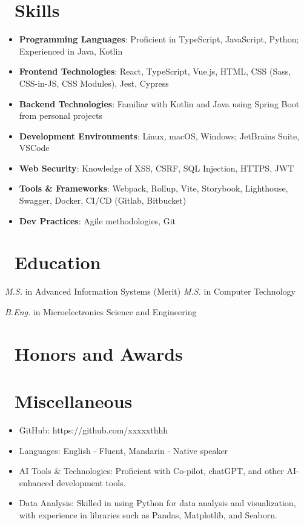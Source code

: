 \documentclass{resume}
\begin{document}
\section{\faCogs\ Skills}
\begin{itemize}[parsep=0.5ex]
  \item \textbf{Programming Languages}: Proficient in TypeScript, JavaScript, Python; Experienced in Java, Kotlin
  \item \textbf{Frontend Technologies}: React, TypeScript, Vue.js, HTML, CSS (Sass, CSS-in-JS, CSS Modules), Jest, Cypress
  \item \textbf{Backend Technologies}: Familiar with Kotlin and Java using Spring Boot from personal projects
  \item \textbf{Development Environments}: Linux, macOS, Windows; JetBrains Suite, VSCode
  \item \textbf{Web Security}: Knowledge of XSS, CSRF, SQL Injection, HTTPS, JWT
  \item \textbf{Tools \& Frameworks}: Webpack, Rollup, Vite, Storybook, Lighthouse, Swagger, Docker, CI/CD (Gitlab, Bitbucket)
  \item \textbf{Dev Practices}: Agile methodologies, Git
\end{itemize}

\section{\faGraduationCap\ Education}
\textit{M.S.} in Advanced Information Systems (Merit)
\textit{M.S.} in Computer Technology

\textit{B.Eng.} in Microelectronics Science and Engineering

\section{\faHeartO\ Honors and Awards}

\section{\faInfo\ Miscellaneous}
\begin{itemize}[parsep=0.5ex]
  \item GitHub: https://github.com/xxxxxthhh
  \item Languages: English - Fluent, Mandarin - Native speaker
  \item AI Tools \& Technologies: Proficient with Co-pilot, chatGPT, and other AI-enhanced development tools.
  \item Data Analysis: Skilled in using Python for data analysis and visualization, with experience in libraries such as Pandas, Matplotlib, and Seaborn.
\end{itemize}

%
%
\end{document}
